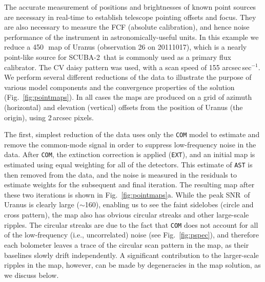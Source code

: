 \documentclass[useAMS,usenatbib,nofootinbib]{mn2e}
\newcommand{\snr}{SNR}
\newcommand{\scuba}{SCUBA-2}
\newcommand{\model}[1]{\texttt{#1}}
\begin{document}
The accurate measurement of positions and brightnesses of known point
sources are necessary in real-time to establish telescope pointing
offsets and focus. They are also necessary to measure the FCF
(absolute calibration), and hence noise performance of the instrument
in astronomically-useful units.  In this example we reduce a
450\,\micron\ map of Uranus (observation 26 on 20111017), which is a
nearly point-like source for \scuba\ that is commonly used as a
primary flux calibrator. The CV daisy pattern was used, with a scan
speed of 155 arcsec\,sec$^{-1}$. We perform several different
reductions of the data to illustrate the purpose of various model
components and the convergence properties of the solution
(Fig.~\ref{fig:pointmaps}). In all cases the maps are produced on a
grid of azimuth (horizontal) and elevation (vertical) offsets from the
position of Uranus (the origin), using 2\,arcsec pixels.

The first, simplest reduction of the data uses only the \model{COM}
model to estimate and remove the common-mode signal in order to
suppress low-frequency noise in the data. After \model{COM}, the
extinction correction is applied (\model{EXT}), and an initial map is
estimated using equal weighting for all of the detectors. This
estimate of \model{AST} is then removed from the data, and the noise
is measured in the residuals to estimate weights for the subsequent
and final iteration. The resulting map after these two iterations is
shown in Fig.~\ref{fig:pointmaps}a. While the peak \snr\ of Uranus is
clearly large ($\sim$160), enabling us to see the faint sidelobes
(circle and cross pattern), the map also has obvious circular streaks
and other large-scale ripples. The circular streaks are due to the
fact that \model{COM} does not account for all of the low-frequency
(i.e., uncorrelated) noise (see Fig.~\ref{fig:pspec}), and therefore
each bolometer leaves a trace of the circular scan pattern in the map,
as their baselines slowly drift independently. A significant
contribution to the larger-scale ripples in the map, however, can be
made by degeneracies in the map solution, as we discuss below.
\end{document}
